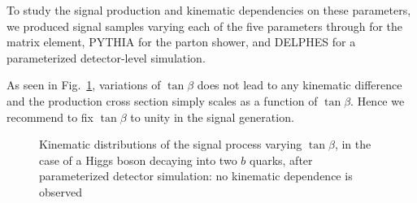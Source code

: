  To study the signal production and kinematic dependencies on these parameters, 
 we produced signal samples varying each of the five parameters through 
 \madgraph for the matrix element, PYTHIA for the parton shower, and DELPHES\cite{deFavereau:2013fsa} 
for a parameterized detector-level simulation.
 
 As seen in Fig.~\ref{fig:DMH_tanbeta}, variations of $\tan{\beta}$ does not lead to any kinematic 
 difference and the production cross section simply scales as a function of $\tan{\beta}$. Hence 
we recommend to fix $\tan{\beta}$ to unity in the signal generation. 


\begin{figure}[htpb!]
\centering
{}
\hfill
{}
\caption{Kinematic distributions of the signal process varying $\tan{\beta}$, in the case of a Higgs boson decaying into two $b$ quarks,
	after parameterized detector simulation: no kinematic dependence is observed}
\label{fig:DMH_tanbeta}
\end{figure}

